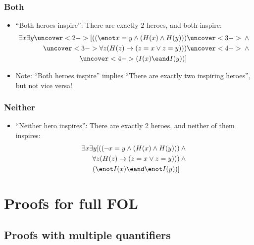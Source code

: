 \begin{frame}
    \frametitle{Both}

\begin{itemize}
\item<1-> ``Both heroes inspire'': There are exactly 2 heroes, and both inspire:
\begin{align*}
\exists x\exists y\uncover<2->{[((\enot x = y \land (H(x) \land H(y)))} & 
\uncover<3->{{} \land {}}\\
\uncover<3->{\forall z(H(z) \to (z = x \lor z = y)))} & \uncover<4->{{}\land {}}\\
\uncover<4->{(I(x) \eand I(y))]}&
\end{align*}
\item<5-> Note: ``Both heroes inspire'' implies ``There are exactly two inspiring heroes'', but not vice versa!
\end{itemize}
\end{frame}

\begin{frame}
    \frametitle{Neither}

\begin{itemize}[<+->]
\item ``Neither hero inspires'': There are exactly 2 heroes, and neither of them inspires:
\begin{align*}
\exists x\exists y[((\lnot x = y \land (H(x) \land H(y))) & {}\land {}\\
\forall z(H(z) \to (z = x \lor z = y))) &{} \land {}\\
(\enot I(x) \eand \enot I(y))]&
\end{align*}
\end{itemize}
\end{frame}


\newhourlecture
\newonlinelecture

\section{Proofs for full FOL}

\subsection{Proofs with multiple quantifiers}

